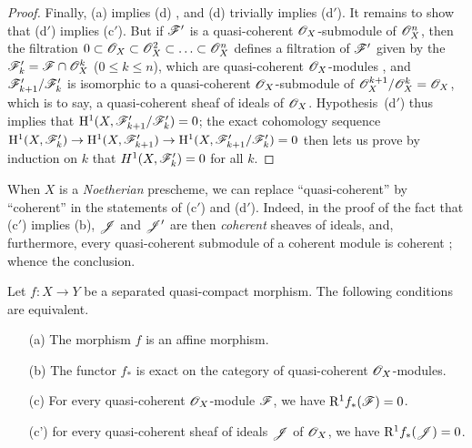 \begin{proof}
Finally, (a) implies (d) , and (d) trivially implies (d$'$).
It remains to show that (d$'$) implies (c$'$).
But if $\mathscr{F}'$ is a quasi-coherent $\mathscr{O}_X$-submodule of $\mathscr{O}_X^n$, then the filtration $0\subset\mathscr{O}_X\subset\mathscr{O}_X^2\subset\ldots\subset\mathscr{O}_X^n$ defines a filtration of $\mathscr{F}'$ given by the $\mathscr{F}'_k=\mathscr{F}\cap\mathscr{O}_X^k$ ($0\leq k\leq n$), which are quasi-coherent $\mathscr{O}_X$-modules , and $\mathscr{F}'_{k+1}/\mathscr{F}'_k$ is isomorphic to a quasi-coherent $\mathscr{O}_X$-submodule of $\mathscr{O}_X^{k+1}/\mathscr{O}_X^k=\mathscr{O}_X$, which is to say, a quasi-coherent sheaf of ideals of $\mathscr{O}_X$.
Hypothesis~(d$'$) thus implies that $\mathrm{H}^1(X,\mathscr{F}'_{k+1}/\mathscr{F}'_k)=0$;
the exact cohomology sequence $\HH^1(X,\sh{F}'_k)\to\HH^1(X,\sh{F}'_{k+1})\to\HH^1(X,\sh{F}'_{k+1}/\sh{F}'_k)=0$ then lets us prove by induction on $k$ that $H^1(X,\mathscr{F}'_k)=0$ for all $k$.
\end{proof}

\begin{remark}[5.2.1.1]
\label{II.5.2.1.1}
When $X$ is a \emph{Noetherian} prescheme, we can replace ``quasi-coherent'' by ``coherent'' in the statements of (c$'$) and (d$'$).
Indeed, in the proof of the fact that (c$'$) implies (b), $\mathscr{J}$ and $\mathscr{J}'$ are then \emph{coherent} sheaves of ideals, and, furthermore, every quasi-coherent submodule of a coherent module is coherent ;
whence the conclusion.
\end{remark}

\begin{corollary}[5.2.2]
\label{II.5.2.2}
Let $f:X\to Y$ be a separated quasi-compact morphism.
The following conditions are equivalent.
\begin{enumerate}
  \item[{\rm(a)}] The morphism $f$ is an affine morphism.
  \item[{\rm(b)}] The functor $f_*$ is exact on the category of quasi-coherent $\mathscr{O}_X$-modules.
  \item[{\rm(c)}] For every quasi-coherent $\mathscr{O}_X$-module $\mathscr{F}$, we have $\mathrm{R}^1 f_*(\mathscr{F})=0$.
  \item[{\rm(c')}] for every quasi-coherent sheaf of ideals $\mathscr{J}$ of $\mathscr{O}_X$, we have $\mathrm{R}^1 f_*(\mathscr{J})=0$.
\end{enumerate}
\end{corollary}

